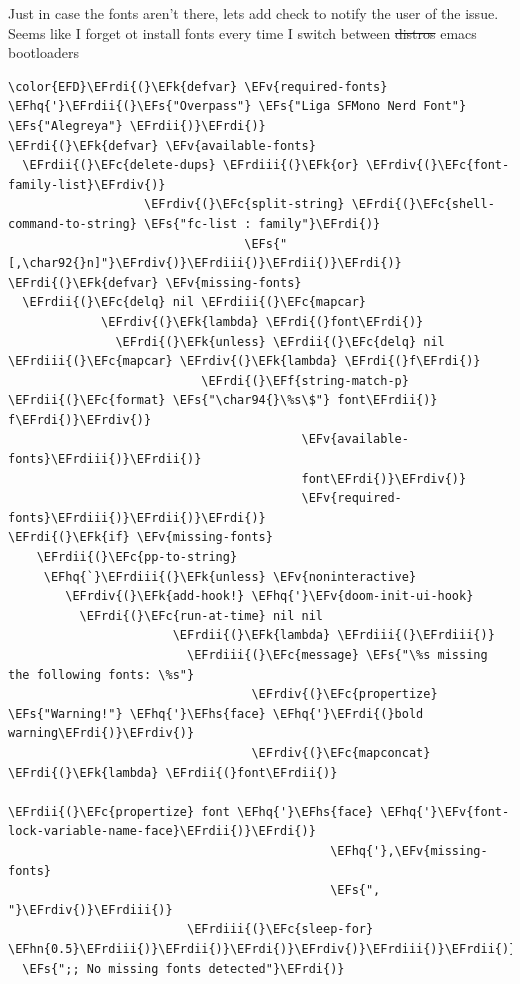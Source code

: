 \documentclass{scrartcl}
\newcommand{\EFk}[1]{\textcolor{EFk}{#1}} %
\newcommand{\EFs}[1]{\textcolor{EFs}{#1}} %
\newcommand{\EFc}[1]{\textcolor{EFc}{#1}} %
\newcommand{\EFv}[1]{\textcolor{EFv}{#1}} %
\newcommand{\EFf}[1]{\textcolor{EFf}{#1}} %
\newcommand{\EFhn}[1]{\textcolor{EFhn}{\textbf{#1}}} %
\newcommand{\EFhq}[1]{\textcolor{EFhq}{#1}} %
\newcommand{\EFhs}[1]{\textcolor{EFhs}{#1}} %
\newcommand{\EFrdi}[1]{\textcolor{EFrdi}{#1}} %
\newcommand{\EFrdii}[1]{\textcolor{EFrdii}{#1}} %
\newcommand{\EFrdiii}[1]{\textcolor{EFrdiii}{#1}} %
\newcommand{\EFrdiv}[1]{\textcolor{EFrdiv}{#1}} %
\begin{document}
Just in case the fonts aren't there, lets add check to notify the user of the
issue. Seems like I forget ot install fonts every time I switch between \sout{distros}
emacs bootloaders
\begin{Code}
\begin{Verbatim}[]
\color{EFD}\EFrdi{(}\EFk{defvar} \EFv{required-fonts} \EFhq{'}\EFrdii{(}\EFs{"Overpass"} \EFs{"Liga SFMono Nerd Font"} \EFs{"Alegreya"} \EFrdii{)}\EFrdi{)}
\EFrdi{(}\EFk{defvar} \EFv{available-fonts}
  \EFrdii{(}\EFc{delete-dups} \EFrdiii{(}\EFk{or} \EFrdiv{(}\EFc{font-family-list}\EFrdiv{)}
                   \EFrdiv{(}\EFc{split-string} \EFrdi{(}\EFc{shell-command-to-string} \EFs{"fc-list : family"}\EFrdi{)}
                                 \EFs{"[,\char92{}n]"}\EFrdiv{)}\EFrdiii{)}\EFrdii{)}\EFrdi{)}
\EFrdi{(}\EFk{defvar} \EFv{missing-fonts}
  \EFrdii{(}\EFc{delq} nil \EFrdiii{(}\EFc{mapcar}
             \EFrdiv{(}\EFk{lambda} \EFrdi{(}font\EFrdi{)}
               \EFrdi{(}\EFk{unless} \EFrdii{(}\EFc{delq} nil \EFrdiii{(}\EFc{mapcar} \EFrdiv{(}\EFk{lambda} \EFrdi{(}f\EFrdi{)}
                           \EFrdi{(}\EFf{string-match-p} \EFrdii{(}\EFc{format} \EFs{"\char94{}\%s\$"} font\EFrdii{)} f\EFrdi{)}\EFrdiv{)}
                                         \EFv{available-fonts}\EFrdiii{)}\EFrdii{)}
                                         font\EFrdi{)}\EFrdiv{)}
                                         \EFv{required-fonts}\EFrdiii{)}\EFrdii{)}\EFrdi{)}
\EFrdi{(}\EFk{if} \EFv{missing-fonts}
    \EFrdii{(}\EFc{pp-to-string}
     \EFhq{`}\EFrdiii{(}\EFk{unless} \EFv{noninteractive}
        \EFrdiv{(}\EFk{add-hook!} \EFhq{'}\EFv{doom-init-ui-hook}
          \EFrdi{(}\EFc{run-at-time} nil nil
                       \EFrdii{(}\EFk{lambda} \EFrdiii{(}\EFrdiii{)}
                         \EFrdiii{(}\EFc{message} \EFs{"\%s missing the following fonts: \%s"}
                                  \EFrdiv{(}\EFc{propertize} \EFs{"Warning!"} \EFhq{'}\EFhs{face} \EFhq{'}\EFrdi{(}bold warning\EFrdi{)}\EFrdiv{)}
                                  \EFrdiv{(}\EFc{mapconcat} \EFrdi{(}\EFk{lambda} \EFrdii{(}font\EFrdii{)}
                                               \EFrdii{(}\EFc{propertize} font \EFhq{'}\EFhs{face} \EFhq{'}\EFv{font-lock-variable-name-face}\EFrdii{)}\EFrdi{)}
                                             \EFhq{'},\EFv{missing-fonts}
                                             \EFs{", "}\EFrdiv{)}\EFrdiii{)}
                         \EFrdiii{(}\EFc{sleep-for} \EFhn{0.5}\EFrdiii{)}\EFrdii{)}\EFrdi{)}\EFrdiv{)}\EFrdiii{)}\EFrdii{)}
  \EFs{";; No missing fonts detected"}\EFrdi{)}
\end{Verbatim}
\end{Code}
\end{document}
